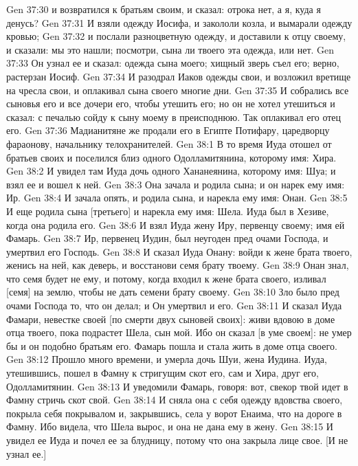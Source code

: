 \vs Gen 37:30 и возвратился к братьям своим, и сказал: отрока нет, а я, куда я денусь?
\vs Gen 37:31 И взяли одежду Иосифа, и закололи козла, и вымарали одежду кровью;
\vs Gen 37:32 и послали разноцветную одежду, и доставили к отцу своему, и сказали: мы это нашли; посмотри, сына ли твоего эта одежда, или нет.
\vs Gen 37:33 Он узнал ее и сказал:  одежда сына моего; хищный зверь съел его; верно, растерзан Иосиф.
\vs Gen 37:34 И разодрал Иаков одежды свои, и возложил вретище на чресла свои, и оплакивал сына своего многие дни.
\vs Gen 37:35 И собрались все сыновья его и все дочери его, чтобы утешить его; но он не хотел утешиться и сказал: с печалью сойду к сыну моему в преисподнюю. Так оплакивал его отец его.
\vs Gen 37:36 Мадианитяне же продали его в Египте Потифару, царедворцу фараонову, начальнику телохранителей.
\vs Gen 38:1 В то время Иуда отошел от братьев своих и поселился близ одного Одолламитянина, которому имя: Хира.
\vs Gen 38:2 И увидел там Иуда дочь одного Хананеянина, которому имя: Шуа; и взял ее и вошел к ней.
\vs Gen 38:3 Она зачала и родила сына; и он нарек ему имя: Ир.
\vs Gen 38:4 И зачала опять, и родила сына, и нарекла ему имя: Онан.
\vs Gen 38:5 И еще родила сына [третьего] и нарекла ему имя: Шела. Иуда был в Хезиве, когда она родила его.
\vs Gen 38:6 И взял Иуда жену Иру, первенцу своему; имя ей Фамарь.
\vs Gen 38:7 Ир, первенец Иудин, был неугоден пред очами Господа, и умертвил его Господь.
\vs Gen 38:8 И сказал Иуда Онану: войди к жене брата твоего, женись на ней, как деверь, и восстанови семя брату твоему.
\vs Gen 38:9 Онан знал, что семя будет не ему, и потому, когда входил к жене брата своего, изливал [семя] на землю, чтобы не дать семени брату своему.
\vs Gen 38:10 Зло было пред очами Господа то, что он делал; и Он умертвил и его.
\vs Gen 38:11 И сказал Иуда Фамари, невестке своей [по смерти двух сыновей своих]: живи вдовою в доме отца твоего, пока подрастет Шела, сын мой. Ибо он сказал [в уме своем]: не умер бы и он подобно братьям его. Фамарь пошла и стала жить в доме отца своего.
\rsbpar\vs Gen 38:12 Прошло много времени, и умерла дочь Шуи, жена Иудина. Иуда, утешившись, пошел в Фамну к стригущим скот его, сам и Хира, друг его, Одолламитянин.
\vs Gen 38:13 И уведомили Фамарь, говоря: вот, свекор твой идет в Фамну стричь скот свой.
\vs Gen 38:14 И сняла она с себя одежду вдовства своего, покрыла себя покрывалом и, закрывшись, села у ворот Енаима, что на дороге в Фамну. Ибо видела, что Шела вырос, и она не дана ему в жену.
\vs Gen 38:15 И увидел ее Иуда и почел ее за блудницу, потому что она закрыла лице свое. [И не узнал ее.]
